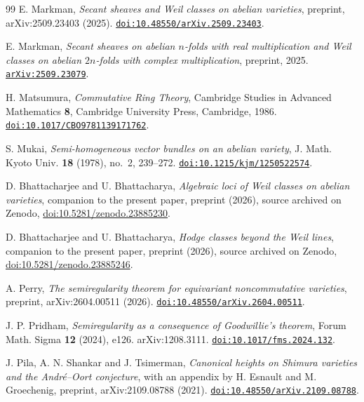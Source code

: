 \documentclass[11pt,reqno]{amsart}
\theoremstyle{plain}
\theoremstyle{definition}
\theoremstyle{remark}
\begin{document}
\begin{thebibliography}{99}
E. Markman,
\emph{Secant sheaves and Weil classes on abelian varieties},
preprint, arXiv:2509.23403 (2025).
\href{https://doi.org/10.48550/arXiv.2509.23403}{\texttt{doi:10.48550/arXiv.2509.23403}}.

E. Markman,
\emph{Secant sheaves on abelian $n$-folds with real multiplication and Weil
classes on abelian $2n$-folds with complex multiplication},
preprint, 2025.
\href{https://arxiv.org/abs/2509.23079}{\texttt{arXiv:2509.23079}}.

H. Matsumura,
\emph{Commutative Ring Theory},
Cambridge Studies in Advanced Mathematics \textbf{8},
Cambridge University Press, Cambridge, 1986.
\href{https://doi.org/10.1017/CBO9781139171762}{\texttt{doi:10.1017/CBO9781139171762}}.

S. Mukai,
\emph{Semi-homogeneous vector bundles on an abelian variety},
J. Math. Kyoto Univ. \textbf{18} (1978), no.~2, 239--272.
\href{https://doi.org/10.1215/kjm/1250522574}{\texttt{doi:10.1215/kjm/1250522574}}.

D. Bhattacharjee and U. Bhattacharya,
\emph{Algebraic loci of Weil classes on abelian varieties},
companion to the present paper, preprint (2026), source archived on Zenodo,
\href{https://doi.org/10.5281/zenodo.23885230}{doi:10.5281/zenodo.23885230}.

D. Bhattacharjee and U. Bhattacharya,
\emph{Hodge classes beyond the Weil lines},
companion to the present paper, preprint (2026), source archived on Zenodo,
\href{https://doi.org/10.5281/zenodo.23885246}{doi:10.5281/zenodo.23885246}.

A. Perry,
\emph{The semiregularity theorem for equivariant noncommutative varieties},
preprint, arXiv:2604.00511 (2026).
\href{https://doi.org/10.48550/arXiv.2604.00511}{\texttt{doi:10.48550/arXiv.2604.00511}}.

J. P. Pridham,
\emph{Semiregularity as a consequence of Goodwillie's theorem},
Forum Math. Sigma \textbf{12} (2024), e126. arXiv:1208.3111.
\href{https://doi.org/10.1017/fms.2024.132}{\texttt{doi:10.1017/fms.2024.132}}.

J. Pila, A. N. Shankar and J. Tsimerman,
\emph{Canonical heights on Shimura varieties and the Andr\'e--Oort
conjecture}, with an appendix by H. Esnault and M. Groechenig,
preprint, arXiv:2109.08788 (2021).
\href{https://doi.org/10.48550/arXiv.2109.08788}{\texttt{doi:10.48550/arXiv.2109.08788}}.


\end{thebibliography}
\end{document}
